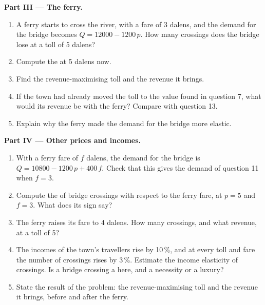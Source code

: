 \begin{problem}
\medskip
\noindent\textbf{Part III --- The ferry.}
\begin{enumerate}[resume]
\item A ferry starts to cross the river, with a fare of 3 dalens, and the demand for the bridge becomes $Q = 12000 - 1200\,p$. How many crossings does the
  bridge lose at a toll of 5 dalens?
\item Compute the  at 5 dalens now.
\item Find the revenue-maximising toll and the revenue it brings.
\item If the town had already moved the toll to the value found in question 7, what would its revenue be with the ferry? Compare with question 13.
\item Explain why the ferry made the demand for the bridge more elastic.
\end{enumerate}

\medskip
\noindent\textbf{Part IV --- Other prices and incomes.}
\begin{enumerate}[resume]
\item With a ferry fare of $f$ dalens, the demand for the bridge is $Q = 10800 - 1200\,p + 400\,f$. Check that this gives the demand of question 11 when $f
  = 3$.
\item Compute the  of bridge crossings with respect to the ferry fare, at $p = 5$ and $f = 3$. What does its sign say?
\item The ferry raises its fare to 4 dalens. How many crossings, and what revenue, at a toll of 5?
\item The incomes of the town's travellers rise by 10\,\%, and at every toll and fare the number of crossings rises by 3\,\%. Estimate the income elasticity
  of crossings. Is a bridge crossing a  here, and a necessity or a luxury?
\item State the result of the problem: the revenue-maximising toll and the revenue it brings, before and after the ferry.
\end{enumerate}
\end{problem}
